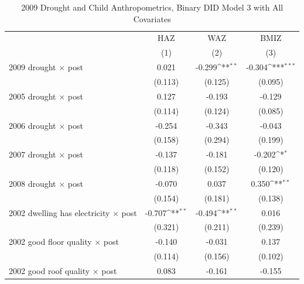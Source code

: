 \documentclass[12pt]{article}
\def\sym#1{\ifmmode^{#1}\else\(^{#1}\)\fi}
\begin{document}
\endgroup
\clearpage
\begingroup
\footnotesize
\renewcommand{\arraystretch}{0.86}
\setlength{\tabcolsep}{4pt}
\setlength{\LTcapwidth}{\textwidth}
\begin{longtable}{p{}ccc}
\caption{2009 Drought and Child Anthropometrics, Binary DID Model 3 with All Covariates}\\
\toprule
 & HAZ & WAZ & BMIZ\\
            &\multicolumn{1}{c}{(1)}         &\multicolumn{1}{c}{(2)}         &\multicolumn{1}{c}{(3)}         \\
\midrule
2009 drought \ensuremath{\times} post&       0.021         &      -0.299\sym{**} &      -0.304\sym{***}\\
            &     (0.113)         &     (0.125)         &     (0.095)         \\
2005 drought \ensuremath{\times} post&       0.127         &      -0.193         &      -0.129         \\
            &     (0.114)         &     (0.124)         &     (0.085)         \\
2006 drought \ensuremath{\times} post&      -0.254         &      -0.343         &      -0.043         \\
            &     (0.158)         &     (0.294)         &     (0.199)         \\
2007 drought \ensuremath{\times} post&      -0.137         &      -0.181         &      -0.202\sym{*}  \\
            &     (0.118)         &     (0.152)         &     (0.120)         \\
2008 drought \ensuremath{\times} post&      -0.070         &       0.037         &       0.350\sym{**} \\
            &     (0.154)         &     (0.181)         &     (0.138)         \\
2002 dwelling has electricity \ensuremath{\times} post&      -0.707\sym{**} &      -0.494\sym{**} &       0.016         \\
            &     (0.321)         &     (0.211)         &     (0.239)         \\
2002 good floor quality \ensuremath{\times} post&      -0.140         &      -0.031         &       0.137         \\
            &     (0.114)         &     (0.156)         &     (0.102)         \\
2002 good roof quality \ensuremath{\times} post&       0.083         &      -0.161         &      -0.155         \\

\end{longtable}
\end{document}
